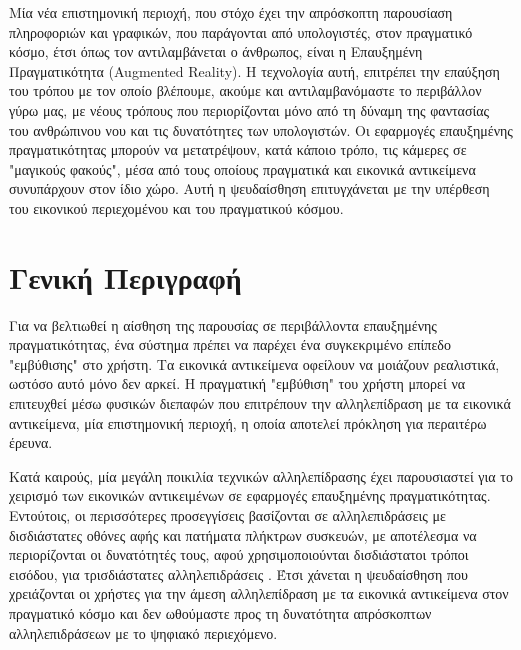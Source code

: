

 \label{c:intro}

Μία νέα επιστημονική περιοχή, που στόχο έχει την απρόσκοπτη παρουσίαση πληροφοριών και γραφικών, που παράγονται από υπολογιστές, στον πραγματικό κόσμο, έτσι όπως τον αντιλαμβάνεται ο άνθρωπος, είναι η Επαυξημένη Πραγματικότητα (Augmented Reality). 
Η τεχνολογία αυτή, επιτρέπει την επαύξηση του τρόπου με τον οποίο βλέπουμε, ακούμε και αντιλαμβανόμαστε το περιβάλλον γύρω μας, με νέους τρόπους που περιορίζονται μόνο από τη δύναμη της φαντασίας του ανθρώπινου νου και τις δυνατότητες των υπολογιστών. Οι εφαρμογές επαυξημένης πραγματικότητας μπορούν να μετατρέψουν, κατά κάποιο τρόπο, τις κάμερες σε "μαγικούς φακούς", μέσα από τους οποίους πραγματικά και εικονικά αντικείμενα συνυπάρχουν στον ίδιο χώρο. Αυτή η ψευδαίσθηση επιτυγχάνεται με την υπέρθεση του εικονικού περιεχομένου και του πραγματικού κόσμου. 


\section{Γενική Περιγραφή}


Για να βελτιωθεί η αίσθηση της παρουσίας σε περιβάλλοντα επαυξημένης πραγματικότητας, ένα σύστημα πρέπει να παρέχει ένα συγκεκριμένο επίπεδο "εμβύθισης" στο χρήστη. Τα εικονικά αντικείμενα οφείλουν να μοιάζουν ρεαλιστικά, ωστόσο αυτό μόνο δεν αρκεί. Η πραγματική "εμβύθιση" του χρήστη μπορεί να επιτευχθεί μέσω φυσικών διεπαφών που επιτρέπουν την αλληλεπίδραση με τα εικονικά αντικείμενα, μία επιστημονική περιοχή, η οποία αποτελεί πρόκληση για περαιτέρω έρευνα.


Κατά καιρούς, μία μεγάλη ποικιλία τεχνικών αλληλεπίδρασης έχει παρουσιαστεί για το χειρισμό των εικονικών αντικειμένων σε εφαρμογές επαυξημένης πραγματικότητας. Εντούτοις, οι περισσότερες προσεγγίσεις βασίζονται σε αλληλεπιδράσεις με δισδιάστατες οθόνες αφής και πατήματα πλήκτρων συσκευών, με αποτέλεσμα να περιορίζονται οι δυνατότητές τους, αφού χρησιμοποιούνται δισδιάστατοι τρόποι εισόδου, για τρισδιάστατες αλληλεπιδράσεις \cite{zhou2008trends} . Έτσι χάνεται η ψευδαίσθηση που χρειάζονται οι χρήστες για την άμεση αλληλεπίδραση με τα εικονικά αντικείμενα στον πραγματικό κόσμο και δεν ωθούμαστε προς τη δυνατότητα απρόσκοπτων αλληλεπιδράσεων με το ψηφιακό περιεχόμενο.


